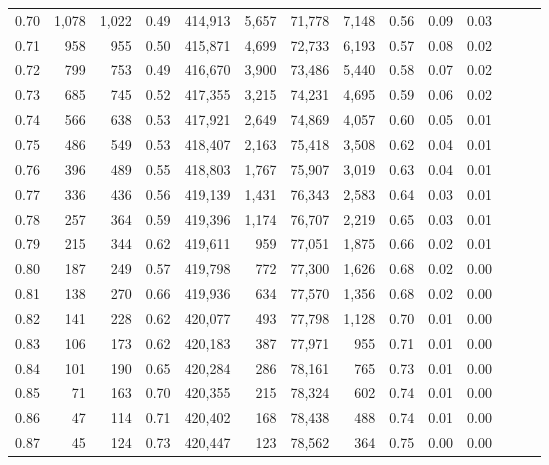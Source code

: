 \begin{tabular}{rrrrrrrrrrrrrr}
0.70 &   1,078 &  1,022 &  0.49 &  414,913 &    5,657 &  71,778 &   7,148 &  0.56 &  0.09 &      0.03 \\
0.71 &     958 &    955 &  0.50 &  415,871 &    4,699 &  72,733 &   6,193 &  0.57 &  0.08 &      0.02 \\
0.72 &     799 &    753 &  0.49 &  416,670 &    3,900 &  73,486 &   5,440 &  0.58 &  0.07 &      0.02 \\
0.73 &     685 &    745 &  0.52 &  417,355 &    3,215 &  74,231 &   4,695 &  0.59 &  0.06 &      0.02 \\
0.74 &     566 &    638 &  0.53 &  417,921 &    2,649 &  74,869 &   4,057 &  0.60 &  0.05 &      0.01 \\
0.75 &     486 &    549 &  0.53 &  418,407 &    2,163 &  75,418 &   3,508 &  0.62 &  0.04 &      0.01 \\
0.76 &     396 &    489 &  0.55 &  418,803 &    1,767 &  75,907 &   3,019 &  0.63 &  0.04 &      0.01 \\
0.77 &     336 &    436 &  0.56 &  419,139 &    1,431 &  76,343 &   2,583 &  0.64 &  0.03 &      0.01 \\
0.78 &     257 &    364 &  0.59 &  419,396 &    1,174 &  76,707 &   2,219 &  0.65 &  0.03 &      0.01 \\
0.79 &     215 &    344 &  0.62 &  419,611 &      959 &  77,051 &   1,875 &  0.66 &  0.02 &      0.01 \\
0.80 &     187 &    249 &  0.57 &  419,798 &      772 &  77,300 &   1,626 &  0.68 &  0.02 &      0.00 \\
0.81 &     138 &    270 &  0.66 &  419,936 &      634 &  77,570 &   1,356 &  0.68 &  0.02 &      0.00 \\
0.82 &     141 &    228 &  0.62 &  420,077 &      493 &  77,798 &   1,128 &  0.70 &  0.01 &      0.00 \\
0.83 &     106 &    173 &  0.62 &  420,183 &      387 &  77,971 &     955 &  0.71 &  0.01 &      0.00 \\
0.84 &     101 &    190 &  0.65 &  420,284 &      286 &  78,161 &     765 &  0.73 &  0.01 &      0.00 \\
0.85 &      71 &    163 &  0.70 &  420,355 &      215 &  78,324 &     602 &  0.74 &  0.01 &      0.00 \\
0.86 &      47 &    114 &  0.71 &  420,402 &      168 &  78,438 &     488 &  0.74 &  0.01 &      0.00 \\
0.87 &      45 &    124 &  0.73 &  420,447 &      123 &  78,562 &     364 &  0.75 &  0.00 &      0.00 \\

\end{tabular}
